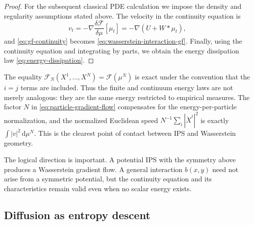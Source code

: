 \documentclass[11pt]{amsart}
\numberwithin{equation}{section}
\theoremstyle{plain}
\newcommand{\dd}{\,\mathrm{d}}
\DeclareMathOperator{\diver}{div}
\begin{document}
\begin{proof}
For the subsequent classical PDE
calculation we impose the density and regularity assumptions stated above. The velocity in the continuity equation is
\[
 v_t=-\nabla\frac{\delta\mathcal F}{\delta\mu}[\mu_t]
     =-\nabla(U+W*\mu_t),
\]
and \eqref{eq:gf-continuity} becomes
\eqref{eq:wasserstein-interaction-gf}.  Finally, using the continuity equation
and integrating by parts, we obtain the energy dissipation law \eqref{eq:energy-dissipation}.
\end{proof}

The equality
$\mathcal F_N(X^1,\ldots,X^N)=\mathcal F(\mu^N)$ is exact under the convention
that the $i=j$ terms are included.  Thus the finite and continuum energy laws
are not merely analogous: they are the same energy restricted to empirical
measures.  The factor $N$ in \eqref{eq:particle-gradient-flow} compensates for
the energy-per-particle normalization, and the normalized Euclidean speed
$N^{-1}\sum_i|\dot X^i|^2$ is exactly
$\int|v|^2\dd\mu^N$.  This is the clearest point of contact between IPS and
Wasserstein geometry.

The logical direction is important.  A potential IPS with the symmetry
above produces a Wasserstein gradient flow.  A general interaction
$b(x,y)$ need not arise from a symmetric potential, but the continuity equation
and its characteristics remain valid even when no scalar energy exists.

\subsection{Diffusion as entropy descent}
\end{document}
